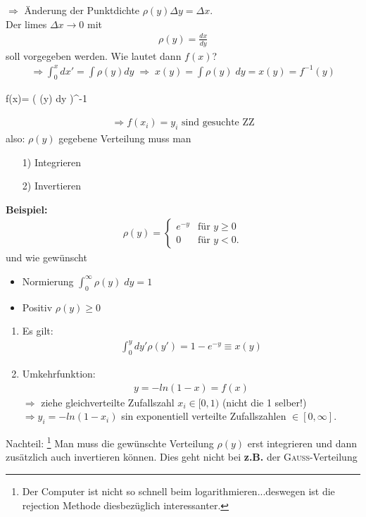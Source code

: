 \documentclass[12pt]{article}
\begin{document}
\begin{itemize}
$\Rightarrow$ Änderung der Punktdichte $\rho(y)\Delta y = \Delta x$. \\
Der limes $\Delta x \to 0$ mit 
\begin{align*}
\rho(y)=\frac{dx}{dy}
\end{align*}
soll vorgegeben werden. Wie lautet dann $f(x)$?
\begin{align}
\Rightarrow  \int_0^x dx' = \int \rho(y) dy \; \Rightarrow \; x(y) = \int \rho(y) \; dy = x(y) = f^{-1}(y) 
\end{align}
\begin{tcolorbox}[ams gather,title=, colback=blue!10!white, colframe=blue!30!black] 
 f(x)= \left( \int \rho(y) \; dy \right)^{-1} 
\end{tcolorbox}
\begin{align*}
\Rightarrow  f(x_i)=y_i \mbox{ sind gesuchte ZZ}
\end{align*} 
also: $\rho(y)$ gegebene Verteilung muss man 
\begin{enumerate}
\item[1)] Integrieren
\item[2)] Invertieren
\end{enumerate}

\textbf{ Beispiel:}
 \begin{align*}
  \rho(y)=
 \begin{cases}
e^{-y} & \text{für } y \geq 0 \\
0 & \text{für } y < 0.
 \end{cases}
 \end{align*}
 und wie gewünscht 
 
 \begin{itemize}
	 \item Normierung 
  		$\int_0^\infty  \rho(y) \; dy = 1 $
 	\item Positiv
 		$\rho(y) \geq 0 $
\end{itemize}

 \begin{enumerate}
 \item Es gilt: \begin{align*}
 \int_0^y dy' \rho(y') = 1- e^{-y} \equiv x(y)
 \end{align*}
 \item Umkehrfunktion:
  \begin{align*}
 y= - ln(1-x) = f(x)
 \end{align*}
 $\Rightarrow$ ziehe gleichverteilte Zufallszahl $x_i \in [0,1)$ (nicht die 1 selber!) \\
 $\Rightarrow y_i = -ln(1-x_i)$ sin exponentiell verteilte Zufallszahlen $\in [0,\infty]$.
 \end{enumerate}
 Nachteil: 
\footnote{Der Computer ist nicht so schnell beim logarithmieren...deswegen ist die rejection Methode diesbezüglich interessanter.}
Man muss die gewünschte Verteilung $\rho(y)$ erst integrieren und dann zusätzlich auch invertieren können. Dies geht nicht bei \textbf{z.B.} der \textsc{Gauß}-Verteilung


\end{itemize}
\end{document}
